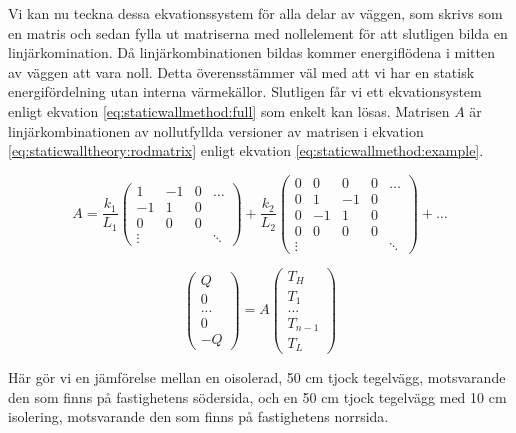 \noindent
Vi kan nu teckna dessa ekvationssystem för alla delar av väggen, som skrivs som 
en matris och sedan fylla ut matriserna med nollelement för att slutligen bilda 
en linjärkomination.
Då linjärkombinationen bildas kommer energiflödena i mitten av väggen att
vara noll. Detta överensstämmer väl med att vi har en statisk energifördelning
utan interna värmekällor.
Slutligen får vi ett ekvationsystem enligt ekvation
\eqref{eq:staticwallmethod:full} som enkelt kan lösas.
Matrisen $A$ är linjärkombinationen av nollutfyllda versioner av matrisen i ekvation
\eqref{eq:staticwalltheory:rodmatrix} enligt ekvation
\eqref{eq:staticwallmethod:example}.

\begin{equation}
\label{eq:staticwallmethod:example}
A = \frac{k_1}{L_1}
\begin{pmatrix}
1 & -1 & 0 &  \dots \\
-1 & 1 & 0 &   \\
0 & 0 & 0 &  \\
\vdots & & & \ddots
\end{pmatrix}
+
\frac{k_2}{L_2}
\begin{pmatrix}
0 & 0 & 0 & 0 & \dots \\
0 & 1 & -1 & 0 &  \\
0 & -1 & 1 & 0 & \\
0 & 0 & 0 & 0 & \\
\vdots & & & & \ddots
\end{pmatrix} + \dots
\end{equation}

\begin{equation}
\label{eq:staticwallmethod:full}
\begin{pmatrix}
Q\\0\\...\\0\\-Q
\end{pmatrix} = A
\begin{pmatrix}
T_H\\T_1\\...\\T_{n-1}\\T_L
\end{pmatrix}
\end{equation}

Här gör vi en jämförelse mellan en oisolerad, 50 cm tjock tegelvägg, motsvarande den som finns på fastighetens södersida, och en 50 cm tjock tegelvägg med 10 cm isolering, motsvarande den som finns på fastighetens norrsida.



